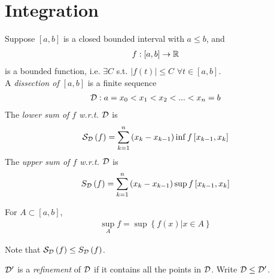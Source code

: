\documentclass[a4paper]{article}
\begin{document}
\newpage
\section{Integration}
Suppose $\left[a,b\right]$ is a closed bounded interval with $a\leq b$, and
\begin{equation*}
\begin{aligned}
f: \left[a,b\right] \to \mathbb{R}
\end{aligned}
\end{equation*}
is a bounded function, i.e. $\exists C$ s.t. $|f\left(t\right)| \leq C$ $\forall t\in \left[a,b\right]$.\\

A \emph{dissection of $\left[a,b\right]$} is a finite sequence
\begin{equation*}
\begin{aligned}
\mathcal{D}: a=x_0 < x_1 < x_2 < ... < x_n = b
\end{aligned}
\end{equation*}
The \emph{lower sum of $f$ w.r.t. $\mathcal{D}$} is
\begin{equation*}
\begin{aligned}
\mathcal{S}_{\mathcal{D}} \left(f\right) = \sum_{k=1}^n \left(x_k - x_{k-1}\right) \inf f\left[x_{k-1},x_k\right] 
\end{aligned}
\end{equation*}
The \emph{upper sum of $f$ w.r.t. $\mathcal{D}$} is
\begin{equation*}
\begin{aligned}
S_{\mathcal{D}} \left(f\right) = \sum_{k=1}^n \left(x_k - x_{k-1}\right) \sup f\left[x_{k-1},x_k\right] 
\end{aligned}
\end{equation*}
\begin{notation}
For $A\subset \left[a,b\right]$,
\begin{equation*}
\begin{aligned}
\sup_A f = \sup \left\{f\left(x\right)|x\in A\right\}
\end{aligned}
\end{equation*}
\end{notation}

Note that $\mathcal{S}_{\mathcal{D}}\left(f\right) \leq S_{\mathcal{D}}\left(f\right)$.
\begin{defi}
$\mathcal{D}'$ is a \emph{refinement} of $\mathcal{D}$ if it contains all the points in $\mathcal{D}$. Write $\mathcal{D} \leq \mathcal{D}'$.
\end{defi}
\end{document}
